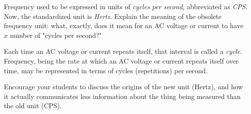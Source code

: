 

Frequency used to be expressed in units of {\it cycles per second}, abbreviated as {\it CPS}.  Now, the standardized unit is {\it Hertz}.  Explain the meaning of the obsolete frequency unit: what, exactly, does it mean for an AC voltage or current to have $x$ number of "cycles per second?"







Each time an AC voltage or current repeats itself, that interval is called a {\it cycle}.  Frequency, being the rate at which an AC voltage or current repeats itself over time, may be represented in terms of cycles (repetitions) per second.







Encourage your students to discuss the origins of the new unit (Hertz), and how it actually communicates less information about the thing being measured than the old unit (CPS).




